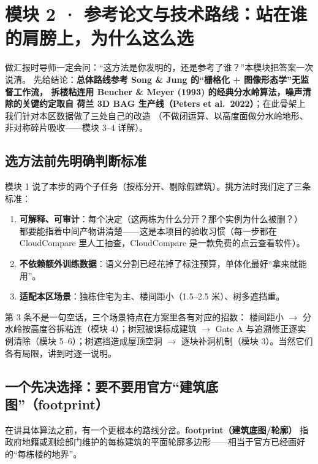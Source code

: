 \section{模块 2 · 参考论文与技术路线：站在谁的肩膀上，为什么这么选}

做汇报时导师一定会问：``这方法是你发明的，还是参考了谁？''本模块把答案一次说清。
先给结论：\textbf{总体路线参考 Song \& Jung 的``栅格化 + 图像形态学''无监督工作流，
拆楼粘连用 Beucher \& Meyer (1993) 的经典分水岭算法，噪声清除的关键约定取自
荷兰 3D BAG 生产线（Peters et al.\ 2022）}；在此骨架上我们针对本区数据做了三处自己的改造
（不做闭运算、以高度面做分水岭地形、非对称碎片吸收——模块 3--4 详解）。

\subsection{选方法前先明确判断标准}

模块 1 说了本步的两个子任务（按栋分开、剔除假建筑）。挑方法时我们定了三条标准：

\begin{enumerate}
\item \textbf{可解释、可审计}：每个决定（这两栋为什么分开？那个实例为什么被删？）
      都要能指着中间产物讲清楚——这是本项目的验收习惯（每一步都在 CloudCompare
      里人工抽查，CloudCompare 是一款免费的点云查看软件）。
\item \textbf{不依赖额外训练数据}：语义分割已经花掉了标注预算，单体化最好``拿来就能用''。
\item \textbf{适配本区场景}：独栋住宅为主、楼间距小（1.5--2.5 米）、树多遮挡重。
\end{enumerate}

第 3 条不是一句空话，三个场景特点在方案里各有对应的招数：
楼间距小 $\to$ 分水岭按高度谷拆粘连（模块 4）；树冠被误标成建筑 $\to$
Gate A 与追溯修正逐实例清除（模块 5--6）；树遮挡造成屋顶空洞 $\to$
逐块补洞机制（模块 3）。当然它们各有局限，讲到时逐一说明。

\subsection{一个先决选择：要不要用官方``建筑底图''（footprint）}

在讲具体算法之前，有一个更根本的路线分岔。\textbf{footprint（建筑底图/轮廓）}
指政府地籍或测绘部门维护的每栋建筑的平面轮廓多边形——相当于官方已经画好的``每栋楼的地界''。

